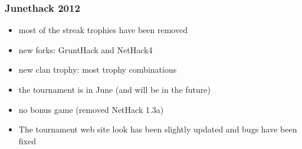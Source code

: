 \documentclass{beamer}
\begin{document}
\begin{frame}
\frametitle{Junethack 2012}
  \begin{itemize}[<+->]
    \item most of the streak trophies have been removed
    \item new forks: GruntHack and NetHack4
    \item new clan trophy: most trophy combinations
    \item the tournament is in June (and will be in the future)
    \item no bonus game (removed NetHack 1.3a)
    \item The tournament web site look has been slightly updated and bugs have been fixed
  \end{itemize}
\end{frame}
\end{document}
